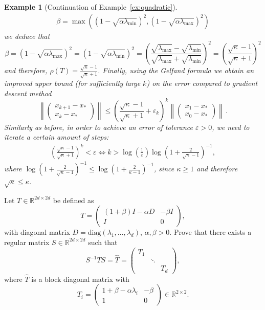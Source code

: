 \documentclass[12pt,openany]{book}
\newtheorem{example}[thm]{Example}
\theoremstyle{definition}
\theoremstyle{definition}
\newcommand{\R}{\mathbb{R}}
\begin{document}
\begin{example}[Continuation of Example~\ref{ex:quadratic}]
\begin{align*}
\beta =  \max\left((1-\sqrt{\alpha\lambda_{\min}})^2,(1-\sqrt{\alpha\lambda_{\max}})^2\right)
\end{align*}
we deduce that
\[ \beta = (1-\sqrt{\alpha\lambda_{\max}})^2 = (1-\sqrt{\alpha\lambda_{\min}})^2 = \left(\frac{\sqrt{\lambda_{\max}}-\sqrt{\lambda_{\min}}}{\sqrt{\lambda_{\max}}+\sqrt{\lambda_{\min}}} \right)^2 = \left(\frac{\sqrt{\kappa}-1}{\sqrt{\kappa}+1} \right)^2 \]
and therefore, $\rho(T)= \frac{\sqrt{\kappa}-1}{\sqrt{\kappa}+1}$. Finally,  using the Gelfand formula we obtain an improved upper bound (for sufficiently large $k$) on the error compared to gradient descent method
\[\left\|\begin{pmatrix}
x_{k+1}-x_\ast \\ x_k-x_\ast
\end{pmatrix}\right\|  \le \left(\frac{\sqrt{\kappa}-1}{\sqrt{\kappa}+1}+\varepsilon_k\right)^k \left\| \begin{pmatrix}
x_1-x_\ast\\ x_0-x_\ast
\end{pmatrix} \right\|\, .\]
Similarly as before,  in order to achieve an error of tolerance $\varepsilon>0$, we need to iterate a certain amount of steps: 
\begin{align*}
\left(\frac{\sqrt{\kappa}-1}{\sqrt{\kappa}+1}\right)^k <\varepsilon \Leftrightarrow k> \log\left(\frac{1}{\varepsilon}\right) \log\left(1+\frac{2}{\sqrt{\kappa}-1}\right)^{-1},
\end{align*}
where $ \log\left(1+\frac{2}{\sqrt{\kappa}-1}\right)^{-1}\le  \log\left(1+\frac{2}{\kappa-1}\right)^{-1}$, since $\kappa\ge1$ and therefore $\sqrt{\kappa}\le \kappa$. 
\end{example}

\begin{exercise}\label{ex:selfsim_matrix}
Let $T\in\R^{2d\times 2d}$ be defined as 
\[T=\begin{pmatrix}
(1+\beta)I -\alpha D & -\beta I\\ I & 0 
\end{pmatrix}, \]
with diagonal matrix $D={\mathrm{diag}}(\lambda_1,\dots,\lambda_d)$, $\alpha,\beta>0$. Prove that there exists a regular matrix $S\in\R^{2d\times 2d}$ such that
\[S^{-1}T S = \widehat T = \begin{pmatrix}
T_1 & \ & \ \\
\ & \ddots & \ \\
\ & \ & T_d
\end{pmatrix}, \]
where $\widehat T$ is a block diagonal matrix with 
\[ T_i = \begin{pmatrix}
1+\beta - \alpha\lambda_i & -\beta \\ 1 & 0
\end{pmatrix}\in\R^{2\times 2}. \]
\end{exercise}
\end{document}
